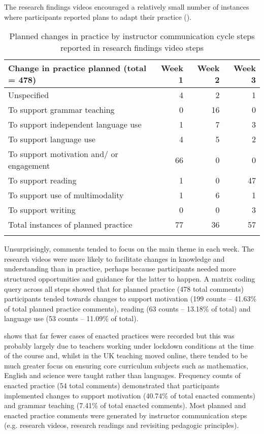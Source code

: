 \documentclass[output=paper]{langscibook}
\begin{document}
The research findings videos encouraged a relatively small number of instances where participants reported plans to adapt their practice ().


\begin{table}
\begin{tabularx}{\textwidth}{Qrrr}
\lsptoprule
{Change in practice planned (total = 478)} & {Week 1} & {Week 2} & {Week 3}\\
\midrule
Unspecified & 4 & 2 & 1\\
To support grammar teaching & 0 & 16 & 0\\
To support independent language use & 1 & 7 & 3\\
To support language use & 4 & 5 & 2\\
To support motivation and/ or engagement & 66 & 0 & 0\\
To support reading & 1 & 0 & 47\\
To support use of multimodality & 1 & 6 & 1\\
To support writing & 0 & 0 & 3\\
\midrule
Total instances of planned practice & 77 & 36 & 57\\
\lspbottomrule
\end{tabularx}
\caption{Planned changes in practice by instructor communication cycle steps reported in research findings video steps}
\label{tab:porter:7}
\end{table}

 Unsurprisingly, comments tended to focus on the main theme in each week. The research videos were more likely to facilitate changes in knowledge and understanding than in practice, perhaps because participants needed more structured opportunities and guidance for the latter to happen. A matrix coding query across all steps showed that for planned practice (478 total comments) participants tended towards changes to support motivation (199 counts -- 41.63\% of total planned practice comments), reading (63 counts -- 13.18\% of total) and language use (53 counts -- 11.09\% of total).

 shows that far fewer cases of enacted practices were recorded but this was probably largely due to teachers working under lockdown conditions at the time of the course and, whilst in the UK teaching moved online, there tended to be much greater focus on ensuring core curriculum subjects such as mathematics, English and science were taught rather than languages. Frequency counts of enacted practice (54 total comments) demonstrated that participants implemented changes to support motivation (40.74\% of total enacted comments) and grammar teaching (7.41\% of total enacted comments). Most planned and enacted practice comments were generated by instructor communication steps (e.g. research videos, research readings and revisiting pedagogic principles).
\end{document}
